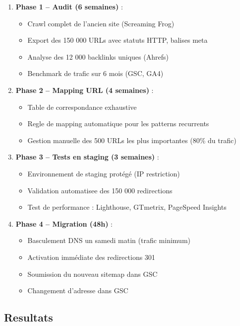 \begin{enumerate}
    \item \textbf{Phase 1 -- Audit (6 semaines)} :
    \begin{itemize}
        \item Crawl complet de l'ancien site (Screaming Frog)
        \item Export des 150 000 URLs avec statuts HTTP, balises meta
        \item Analyse des 12 000 backlinks uniques (Ahrefs)
        \item Benchmark de trafic sur 6 mois (GSC, GA4)
    \end{itemize}
    \item \textbf{Phase 2 -- Mapping URL (4 semaines)} :
    \begin{itemize}
        \item Table de correspondance exhaustive
        \item Regle de mapping automatique pour les patterns recurrents
        \item Gestion manuelle des 500 URLs les plus importantes (80\% du trafic)
    \end{itemize}
    \item \textbf{Phase 3 -- Tests en staging (3 semaines)} :
    \begin{itemize}
        \item Environnement de staging protégé (IP restriction)
        \item Validation automatisee des 150 000 redirections
        \item Test de performance : Lighthouse, GTmetrix, PageSpeed Insights
    \end{itemize}
    \item \textbf{Phase 4 -- Migration (48h)} :
    \begin{itemize}
        \item Basculement DNS un samedi matin (trafic minimum)
        \item Activation immédiate des redirections 301
        \item Soumission du nouveau sitemap dans GSC
        \item Changement d'adresse dans GSC
    \end{itemize}
\end{enumerate}

\subsection{Resultats}

